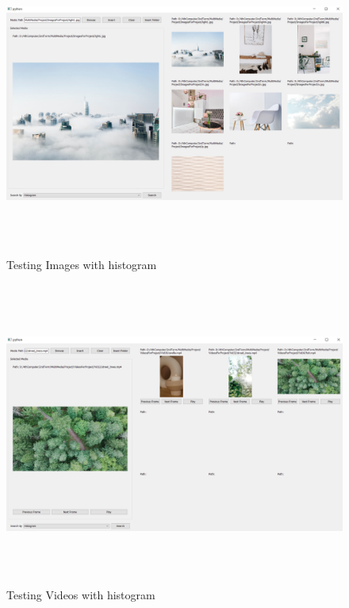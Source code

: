   \begin{figure}[H]
    \centering
    \includegraphics[width=120mm,height=100mm]{Images/2.png}
    \caption{Testing Images with histogram}
  \end{figure}

  \begin{figure}[H]
    \centering
    \includegraphics[width=120mm,height=100mm]{Images/3.png}
    \caption{Testing Videos with histogram}
  \end{figure}

